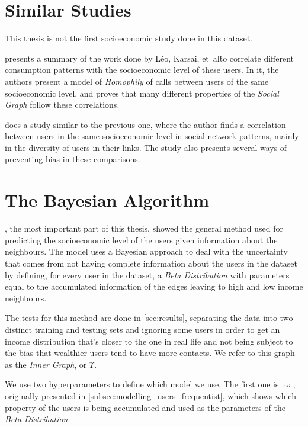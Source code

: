 \section{Similar Studies}

This thesis is not the first socioeconomic study done in this dataset.

 presents a summary of the work done by Léo, Karsai, et\ al\. to correlate different consumption patterns with the socioeconomic level of these users.
In it, the authors present a model of \emph{Homophily} of calls between users of the same socioeconomic level, and proves that many different properties of the \emph{Social Graph} follow these correlations.

 does a study similar to the previous one, where the author finds a correlation between users in the same socioeconomic level in social network patterns, mainly in the diversity of users in their links.
The study also presents several ways of preventing bias in these comparisons.

\section{The Bayesian Algorithm}

, the most important part of this thesis, showed the general method used for predicting the socioeconomic level of the users given information about the neighbours.
The model uses a Bayesian approach to deal with the uncertainty that comes from not having complete information about the users in the dataset by defining, for every user in the dataset, a \emph{Beta Distribution} with parameters equal to the accumulated information of the edges leaving to high and low income neighbours.

The tests for this method are done in \cref{sec:results}, separating the data into two distinct training and testing sets and ignoring some users in order to get an income distribution that's closer to the one in real life and not being subject to the bias that wealthier users tend to have more contacts.
We refer to this graph as the \emph{Inner Graph}, or $\Upsilon$.

We use two hyperparameters to define which model we use. The first one is $\varpi$, originally presented in \cref{subsec:modelling_users_frequentist}, which shows which property of the users is being accumulated and used as the parameters of the \emph{Beta Distribution}.

